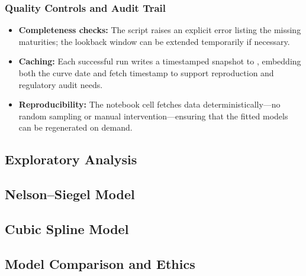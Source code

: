 \documentclass[12pt]{article}
\newcommand{\inlinecode}[1]{\texttt{\detokenize{#1}}}
\begin{document}
\begin{spacing}{1.15}
\subsubsection{Quality Controls and Audit Trail}
\begin{itemize}
    \item \textbf{Completeness checks:} The script raises an explicit error listing the missing maturities; the lookback window can be extended temporarily if necessary.
    \item \textbf{Caching:} Each successful run writes a timestamped snapshot to \inlinecode{data/raw/}, embedding both the curve date and fetch timestamp to support reproduction and regulatory audit needs.
    \item \textbf{Reproducibility:} The notebook cell fetches data deterministically---no random sampling or manual intervention---ensuring that the fitted models can be regenerated on demand.
\end{itemize}

\end{spacing}

\subsection{Exploratory Analysis}
\begin{spacing}{1.15}
\end{spacing}

\subsection{Nelson--Siegel Model}
\begin{spacing}{1.15}
\end{spacing}

\subsection{Cubic Spline Model}
\begin{spacing}{1.15}
\end{spacing}

\subsection{Model Comparison and Ethics}
\begin{spacing}{1.15}
\end{spacing}

\printbibliography
\end{document}
